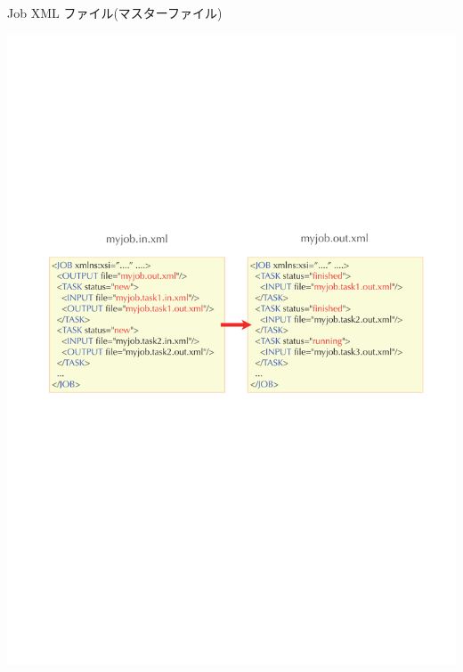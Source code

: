 \begin{frame}{Job XML ファイル(マスターファイル)}
  \begin{center}
    \includegraphics[height=.6\textheight]{simulation2.pdf}
  \end{center}
\end{frame}

